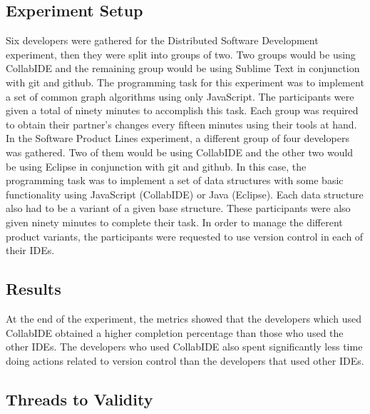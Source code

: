 \subsection{Experiment Setup}

Six developers were gathered for the Distributed Software Development experiment, then they were split into groups of two. Two groups would be using CollabIDE and the remaining group would be using Sublime Text in conjunction with git and github. The programming task for this experiment was to implement a set of common graph algorithms using only JavaScript. The participants were given a total of ninety minutes to accomplish this task. Each group was required to obtain their partner’s changes every fifteen minutes using their tools at hand.
In the Software Product Lines experiment, a different group of four developers was gathered. Two of them would be using CollabIDE and the other two would be using Eclipse in conjunction with git and github. In this case, the programming task was to implement a set of data structures with some basic functionality using JavaScript (CollabIDE) or Java (Eclipse). Each data structure also had to be a variant of a given base structure. These participants were also given ninety minutes to complete their task. In order to manage the different product variants, the participants were requested to use version control in each of their IDEs.


	

\subsection{Results}

At the end of the experiment, the metrics showed that the developers which used CollabIDE obtained 
a higher completion percentage than those who used the other IDEs. The developers who used 
CollabIDE also spent significantly less time doing actions related to version control than the 
developers that used other IDEs.

\subsection{Threads to Validity}



\endinput